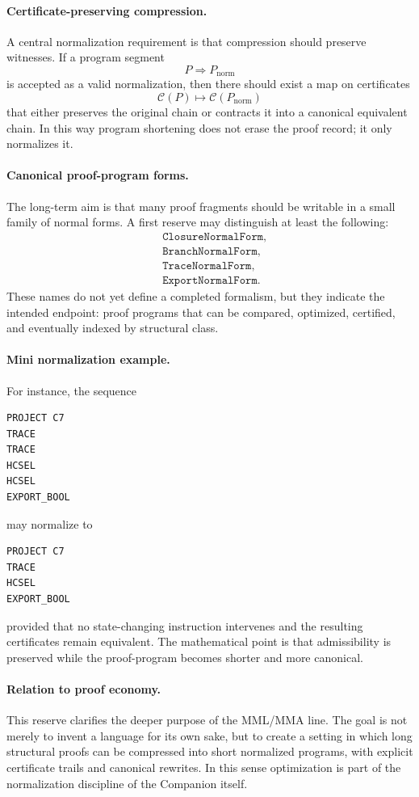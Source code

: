 \documentclass[12pt,a4paper]{article}
\begin{document}
\paragraph{Certificate-preserving compression.}
A central normalization requirement is that compression should preserve witnesses. If a program segment
\[
P \Longrightarrow P_{\mathrm{norm}}
\]
is accepted as a valid normalization, then there should exist a map on certificates
\[
\mathcal C(P) \longmapsto \mathcal C(P_{\mathrm{norm}})
\]
that either preserves the original chain or contracts it into a canonical equivalent chain. In this way program shortening does not erase the proof record; it only normalizes it.

\paragraph{Canonical proof-program forms.}
The long-term aim is that many proof fragments should be writable in a small family of normal forms. A first reserve may distinguish at least the following:
\begin{align*}
&\texttt{ClosureNormalForm},\\
&\texttt{BranchNormalForm},\\
&\texttt{TraceNormalForm},\\
&\texttt{ExportNormalForm}.
\end{align*}
These names do not yet define a completed formalism, but they indicate the intended endpoint: proof programs that can be compared, optimized, certified, and eventually indexed by structural class.

\paragraph{Mini normalization example.}
For instance, the sequence
\begin{verbatim}
PROJECT C7
TRACE
TRACE
HCSEL
HCSEL
EXPORT_BOOL
\end{verbatim}
may normalize to
\begin{verbatim}
PROJECT C7
TRACE
HCSEL
EXPORT_BOOL
\end{verbatim}
provided that no state-changing instruction intervenes and the resulting certificates remain equivalent. The mathematical point is that admissibility is preserved while the proof-program becomes shorter and more canonical.

\paragraph{Relation to proof economy.}
This reserve clarifies the deeper purpose of the MML/MMA line. The goal is not merely to invent a language for its own sake, but to create a setting in which long structural proofs can be compressed into short normalized programs, with explicit certificate trails and canonical rewrites. In this sense optimization is part of the normalization discipline of the Companion itself.
\end{document}
